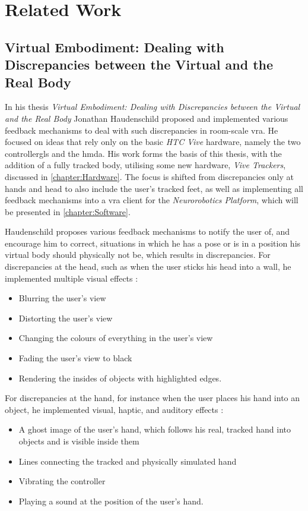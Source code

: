 
\chapter{Related Work}\label{chapter:RelatedWork}

\section{Virtual Embodiment: Dealing with Discrepancies between the Virtual and the Real Body}

In his thesis \textit{Virtual Embodiment:  Dealing with Discrepancies between the Virtual and the Real Body} \autocite{JohnnyVEThesis} Jonathan Haudenschild proposed and implemented various feedback mechanisms to deal with such discrepancies in room-scale \gls{vra}. He focused on ideas that rely only on the basic \textit{HTC Vive} hardware, namely the two \glspl{controllergl} and the \gls{hmda}.
\newline
His work forms the basis of this thesis, with the addition of a fully tracked body, utilising some new hardware, \textit{Vive Trackers}, discussed in \autoref{chapter:Hardware}. The focus is shifted from discrepancies only at hands and head to also include the user's tracked feet, as well as implementing all feedback mechanisms into a \gls{vra} client for the \textit{Neurorobotics Platform}, which will be presented in \autoref{chapter:Software}.
\newline

Haudenschild proposes various feedback mechanisms to notify the user of, and encourage him to correct, situations in which he has a pose or is in a position his virtual body should physically not be, which results in discrepancies.
\newline
For discrepancies at the head, such as when the user sticks his head into a wall, he implemented multiple visual effects \autocite[p. ~20]{JohnnyVEThesis}:
\begin{itemize}
    \item Blurring the user's view
    \item Distorting the user's view
    \item Changing the colours of everything in the user's view
    \item Fading the user's view to black
    \item Rendering the insides of objects with highlighted edges.
\end{itemize}
For discrepancies at the hand, for instance when the user places his hand into an object, he implemented visual, haptic, and auditory effects \autocite[p. ~24-25]{JohnnyVEThesis}:
\begin{itemize}
    \item A ghost image of the user's hand, which follows his real, tracked hand into objects and is visible inside them
    \item Lines connecting the tracked and physically simulated hand
    \item Vibrating the controller
    \item Playing a sound at the position of the user's hand.
\end{itemize}

